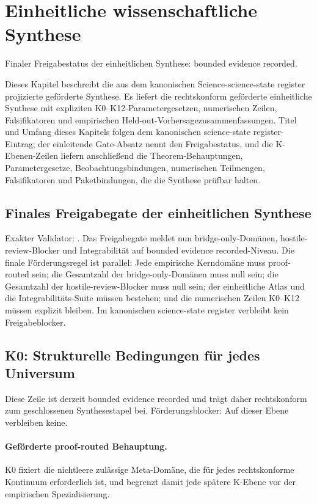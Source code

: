 \section{Einheitliche wissenschaftliche Synthese}
\label{sec:oc-core-1-3-unified-synthesis}
Finaler Freigabestatus der einheitlichen Synthese: bounded evidence recorded.

Dieses Kapitel beschreibt die aus dem kanonischen Science-science-state register projizierte geförderte Synthese. Es liefert die rechtskonform geförderte einheitliche Synthese mit expliziten K0--K12-Parametergesetzen, numerischen Zeilen, Falsifikatoren und empirischen Held-out-Vorhersagezusammenfassungen.
Titel und Umfang dieses Kapitels folgen dem kanonischen science-state register-Eintrag; der einleitende Gate-Absatz nennt den Freigabestatus, und die K-Ebenen-Zeilen liefern anschließend die Theorem-Behauptungen, Parametergesetze, Beobachtungsbindungen, numerischen Teilmengen, Falsifikatoren und Paketbindungen, die die Synthese prüfbar halten.

\subsection{Finales Freigabegate der einheitlichen Synthese}
Exakter Validator: .
Das Freigabegate meldet nun  bridge-only-Domänen,  hostile-review-Blocker und Integrabilität auf bounded evidence recorded-Niveau.
Die finale Förderungsregel ist parallel: Jede empirische Kerndomäne muss proof-routed sein; die Gesamtzahl der bridge-only-Domänen muss null sein; die Gesamtzahl der hostile-review-Blocker muss null sein; der einheitliche Atlas und die Integrabilitäts-Suite müssen bestehen; und die numerischen Zeilen K0--K12 müssen explizit bleiben.
Im kanonischen science-state register verbleibt kein Freigabeblocker.

\subsection{K0: Strukturelle Bedingungen für jedes Universum}
\label{sec:oc-core-1-3-synthesis-k0}
Diese Zeile ist derzeit bounded evidence recorded und trägt daher rechtskonform zum geschlossenen Synthesestapel bei.
Förderungsblocker: Auf dieser Ebene verbleiben keine.

\paragraph{Geförderte proof-routed Behauptung.}
K0 fixiert die nichtleere zulässige Meta-Domäne, die für jedes rechtskonforme Kontinuum erforderlich ist, und begrenzt damit jede spätere K-Ebene vor der empirischen Spezialisierung.

